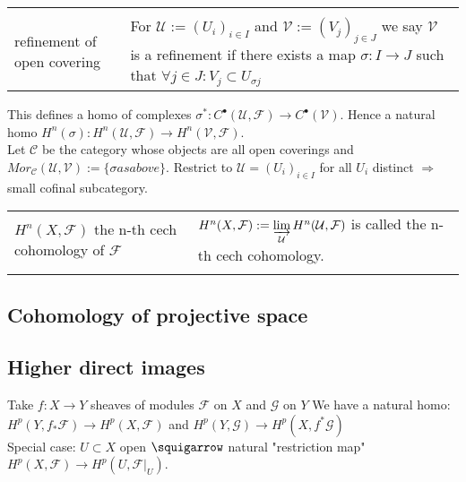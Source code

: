 \documentclass[a4paper, 12pt]{article}
\newcommand{\ca}[1]{\mathcal{#1}}
\newcommand{\caf}{\mathcal{F}}
\newcommand{\cag}{\mathcal{G}}
\newcommand{\cau}{\mathcal{U}}
\begin{document}
{\begin{longtable}{p{}  p{} }
  &\\

  refinement of open covering & For $\cau := (U_i)_{i \in I}$ and $\ca{V} := (V_j)_{j \in J}$ we say $\ca{V}$ is a refinement if there exists a map $\sigma : I \longrightarrow J $ such that $\forall j \in J : V_j \subset U_{\sigma j}$

&\\  
  
\end{longtable}

This defines a homo of complexes $\sigma^*: C^{\bullet}(\cau, \caf) \longrightarrow C^{\bullet}(\ca{V})$. Hence a natural homo $H^n(\sigma) : H^n(\cau , \caf) \longrightarrow H^n( \ca{V} , \caf)$.\\

Let $\ca{C}$ be the category whose objects are all open coverings and $Mor_{\ca{C}}(\cau, \ca{V}) := \{ \sigma as above\}$. Restrict to $\cau = (U_i)_{i \in I}$ for all $U_i$ distinct $\Longrightarrow$ small cofinal subcategory.\\

\begin{longtable}{p{}  p{} }

  $H^n(X,\caf)$ the n-th cech cohomology of $\caf$ & $H^n(X, \caf ) := \varinjlim\limits_{\cau} H^n(\cau , \caf)$ is called the n-th cech cohomology.\\


  &\\
\end{longtable}

  


  \subsection{Cohomology of projective space}

  \subsection{Higher direct images}

  Take $f:X \rightarrow Y$ sheaves of modules $\caf$ on $X$ and $\cag$ on $Y$
  We have a natural homo: $H^p(Y,f_* \caf) \rightarrow H^p(X, \caf)$ and $H^p(Y, \cag) \rightarrow H^p(X, f^* \cag)$
  \\

  Special case: $U \subset X$ open $\squigarrow$ natural "restriction map" $H^p(X, \caf)\longrightarrow H^p(U, \caf |_U)$.\\

}
\end{document}
